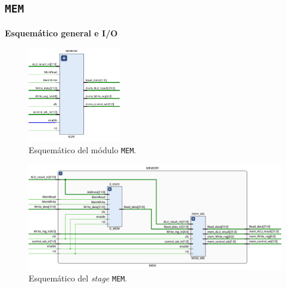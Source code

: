 \documentclass[a4paper]{article}
\begin{document}
%
%
%

\subsection{\texttt{MEM}}

\textbf{Esquemático general e I/O}

\begin{figure}[H]
	\begin{center}				
	\includegraphics[width=0.36\textwidth,center]{MEM_1.png}
  	\caption{Esquemático del módulo \texttt{MEM}.}
  	\label{fig:funcionamiento.}
  	\end{center}
\end{figure}

\begin{figure}[H]
	\begin{center}				
	\includegraphics[width=1.5\textwidth,center]{MEM_2.png}
  	\caption{Esquemático del \textit{stage} \texttt{MEM}.}
  	\label{fig:funcionamiento.}
  	\end{center}
\end{figure}
\end{document}
